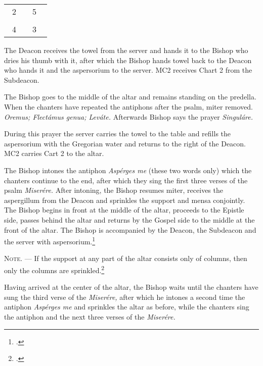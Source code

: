 \documentclass[letterpaper]{report}
\newcommand\crossplan{
\begin{center}
    \begin{tabular}{ | l c r | }
       \hline
        \cross\ {\tiny 2} &         & {\tiny 5} \cross\ \\
                           & \cross &           \\
        \cross\ {\tiny 4} &         & {\tiny 3} \cross\ \\
       \hline
   \end{tabular} 
\end{center}
}
\begin{document}
{    \crossplan

    The Deacon receives the towel from the server and hands it to the Bishop who
    dries his thumb with it, after which the Bishop hands towel back to the Deacon
    who hands it and the aspersorium to the server. MC2 receives Chart 2 from
    the Subdeacon.

    \rubric The Bishop goes to the middle of the altar and remains standing on the
    predella. When the chanters have repeated the antiphons after the psalm, miter
    removed. \textit{Oremus; Flectámus genua; Leváte.} Afterwards Bishop says the
    prayer \textit{Singuláre.}

    During this prayer the server carries the towel to the table and refills the
    aspersorium with the Gregorian water and returns to the right of the Deacon.
    MC2 carries Cart 2 to the altar.

    \rubric The Bishop intones the antiphon \textit{Asp\'erges me} (these two
    words only) which the chanters continue to the end, after which they sing
    the first three verses of the psalm \textit{Miser\'ere.} After intoning,
    the Bishop resumes miter, receives the aspergillum from the Deacon and
    sprinkles the support and mensa conjointly. The Bishop begins in front at
    the middle of the altar, proceeds to the Epistle side, passes behind the
    altar and returns by the Gospel side to the middle at the front of the
    altar. The Bishop is accompanied by the Deacon, the Subdeacon and the
    server with aspersorium.\footcite[If the back part of the altar is attached
    to the wall, so that the Bishop cannot go around it, he sprinkles only the
    \textit{base} of the altar when passing from the middle to the Epistle
    corner, then the Epistle side of the altar, afterwards the table of the
    altar from the Epistle corner to the Gospel corner, then the Gospel side of
    the altar and finally the \textit{base} in front of the altar from the
    Gospel corner to the middle.][footnote, p. 68.]{consecranda}

    \textsc{Note. ---} If the support at any part of the altar consists only of
    columns, then only the columns are sprinkled.\footcite[][p. 68.]{consecranda}

    \rubric Having arrived at the center of the altar, the Bishop waits until
    the chanters have sung the third verse of the \textit{Miser\'ere,} after
    which he intones a second time the antiphon \textit{Asp\'erges me} and
    sprinkles the altar as before, while the chanters sing the antiphon and the
    next three verses of the \textit{Miser\'ere.}

}
\end{document}
